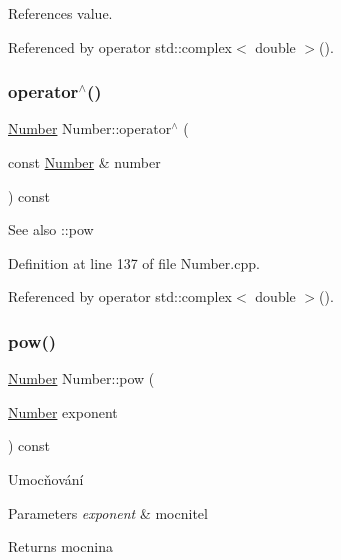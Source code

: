 References value.



Referenced by operator std\+::complex$<$ double $>$().

\mbox{\label{classteam22_1_1_math_1_1_number_a7487165b416ce5db617eabb4d3415853}} 
\subsubsection{\texorpdfstring{operator$^\wedge$()}{operator^()}}
{\footnotesize\ttfamily \hyperlink{classteam22_1_1_math_1_1_number}{Number} Number\+::operator$^\wedge$ (\begin{DoxyParamCaption}\item[{const \hyperlink{classteam22_1_1_math_1_1_number}{Number} \&}]{number }\end{DoxyParamCaption}) const}

\begin{DoxySeeAlso}{See also}
\+::pow 
\end{DoxySeeAlso}


Definition at line 137 of file Number.\+cpp.



Referenced by operator std\+::complex$<$ double $>$().

\mbox{\label{classteam22_1_1_math_1_1_number_af6d6c446579d8b8c2de69053baddd94d}} 
\subsubsection{\texorpdfstring{pow()}{pow()}}
{\footnotesize\ttfamily \hyperlink{classteam22_1_1_math_1_1_number}{Number} Number\+::pow (\begin{DoxyParamCaption}\item[{\hyperlink{classteam22_1_1_math_1_1_number}{Number}}]{exponent }\end{DoxyParamCaption}) const}



Umocňování 


\begin{DoxyParams}{Parameters}
{\em exponent} & mocnitel \\
\hline
\end{DoxyParams}
\begin{DoxyReturn}{Returns}
mocnina 
\end{DoxyReturn}

